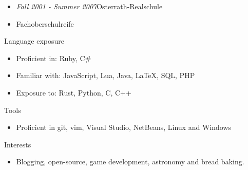 \documentclass[12pt]{article}
\begin{document}
\begin{itemize}
  \setlength{\itemsep}{0cm}
  \setlength{\parskip}{0.1cm}
  \item[] \emph{Fall 2001 - Summer 2007}\hfill Osterrath-Realschule
  \item[] Fachoberschulreife
\end{itemize}

\vspace{0.5cm}
{\Large Language exposure}
\begin{itemize}
  \setlength{\itemsep}{0cm}
  \setlength{\parskip}{0cm}
  \item[] Proficient in: Ruby, C\#
  \item[] Familiar with: JavaScript, Lua, Java, LaTeX, SQL, PHP
  \item[] Exposure to: Rust, Python, C, C++
\end{itemize}

\vspace{0.5cm}
{\Large Tools}
\begin{itemize}
  \setlength{\itemsep}{0cm}
  \setlength{\parskip}{0cm}
  \item[] Proficient in git, vim, Visual Studio, NetBeans, Linux and Windows
\end{itemize}

\vspace{0.5cm}
{\Large Interests}
\begin{itemize}
  \setlength{\itemsep}{0cm}
  \setlength{\parskip}{0cm}
  \item[] Blogging, open-source, game development, astronomy and bread baking.
\end{itemize}
\end{document}
